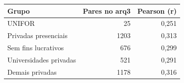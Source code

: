 \begin{tabular}{lrr}
\toprule
Grupo & Pares no arq3 & Pearson (r) \\
\midrule
UNIFOR & 25 & 0,251 \\
Privadas presenciais & 1203 & 0,313 \\
Sem fins lucrativos & 676 & 0,299 \\
Universidades privadas & 521 & 0,291 \\
Demais privadas & 1178 & 0,316 \\
\bottomrule
\end{tabular}
